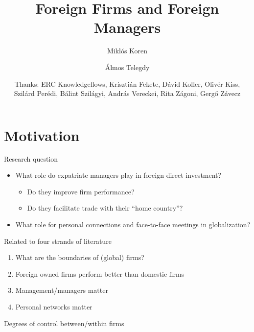 \documentclass[
  ignorenonframetext,
  aspectratio=43,
]{beamer}
\title{Foreign Firms and Foreign Managers}
\author{Miklós Koren \and Álmos Telegdy}
\date{Thanks: ERC Knowledgeflows, Krisztián Fekete, Dávid Koller, Olivér
Kiss, Szilárd Perédi, Bálint Szilágyi, András Vereckei, Rita Zágoni,
Gergő Závecz}
\providecommand{\tightlist}{%
  \setlength{\itemsep}{0pt}\setlength{\parskip}{0pt}}
\begin{document}
\frame{\titlepage}

\hypertarget{motivation}{%
\section{Motivation}\label{motivation}}

\begin{frame}{Research question}
\protect\hypertarget{research-question}{}
\begin{itemize}
\tightlist
\item
  What role do expatriate managers play in foreign direct investment?

  \begin{itemize}
  \tightlist
  \item
    Do they improve firm performance?
  \item
    Do they facilitate trade with their ``home country''?
  \end{itemize}
\item
  What role for personal connections and face-to-face meetings in
  globalization?
\end{itemize}
\end{frame}

\begin{frame}{Related to four strands of literature}
\protect\hypertarget{related-to-four-strands-of-literature}{}
\begin{enumerate}
\tightlist
\item
  What are the boundaries of (global) firms?
\item
  Foreign owned firms perform better than domestic firms
\item
  Management/managers matter
\item
  Personal networks matter
\end{enumerate}
\end{frame}

\begin{frame}{Degrees of control between/within firms}
\protect\hypertarget{degrees-of-control-betweenwithin-firms}{}
\end{frame}
\end{document}
